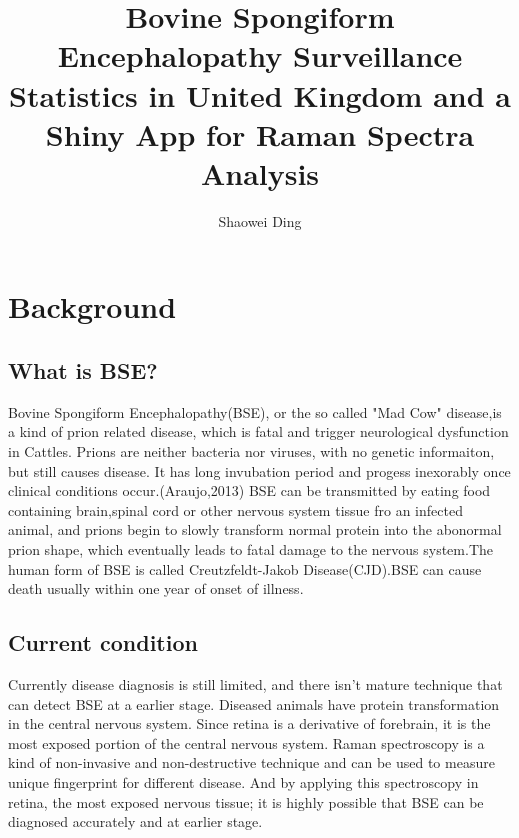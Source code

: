 \documentclass{article}\usepackage[]{graphicx}\usepackage[]{color}
\title{Bovine Spongiform Encephalopathy Surveillance Statistics in United Kingdom and a Shiny App for Raman Spectra Analysis}
\author{Shaowei Ding}
\begin{document}
\maketitle



\section{Background}
\begin{enumerate}
\subsection{What is BSE?}
    Bovine Spongiform Encephalopathy(BSE), or the so called "Mad Cow" disease,is a kind of prion related disease, which is fatal and trigger neurological dysfunction in Cattles. Prions are neither bacteria nor viruses, with no genetic informaiton, but still causes disease. It has long invubation period and progess inexorably once clinical conditions occur.(Araujo,2013) BSE can be transmitted by eating food containing brain,spinal cord or other nervous system tissue fro an infected animal, and prions begin to slowly transform normal protein into the abonormal prion shape, which eventually leads to fatal damage to the nervous system.The human form of BSE is called Creutzfeldt-Jakob Disease(CJD).BSE can cause death usually within one year of onset of illness.
\end{enumerate}
\begin{enumerate}
\subsection{Current condition}    
    Currently disease diagnosis is still limited, and there isn't mature technique that can detect BSE at a earlier stage. Diseased animals have protein transformation in the central nervous system. Since retina is a derivative of forebrain, it is the most exposed portion of the central nervous system. Raman spectroscopy is a kind of non-invasive and non-destructive technique and can be used to measure unique fingerprint for different disease. And by applying this spectroscopy in retina, the 
most exposed nervous tissue; it is highly possible that BSE can be diagnosed accurately and at earlier stage.
\end{enumerate}
\end{document}
